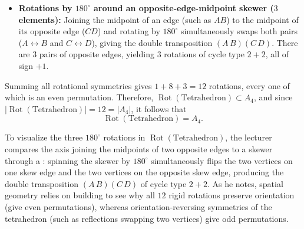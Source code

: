 \begin{proofWrapper}[Proof that \texorpdfstring{$\operatorname{Rot}(\text{Tetrahedron}) = A_4$}{Rot(Tetrahedron) = A\_4}]
\begin{content}
\begin{center}
\end{center}

\begin{itemize}
    \item \textbf{Rotations by $180^\circ$ around an opposite-edge-midpoint skewer ($3$ elements):} Joining the midpoint of an edge (such as $AB$) to the midpoint of its opposite edge ($CD$) and rotating by $180^\circ$ simultaneously swaps both pairs ($A \leftrightarrow B$ and $C \leftrightarrow D$), giving the double transposition $(A\,B)(C\,D)$. There are $3$ pairs of opposite edges, yielding $3$ rotations of cycle type $2+2$, all of sign $+1$.
\end{itemize}

Summing all rotational symmetries gives $1 + 8 + 3 = 12$ rotations, every one of which is an even permutation. Therefore, $\operatorname{Rot}(\text{Tetrahedron}) \subset A_4$, and since $|\operatorname{Rot}(\text{Tetrahedron})| = 12 = |A_4|$, it follows that
\[
\operatorname{Rot}(\text{Tetrahedron}) = A_4.
\]
\end{content}

\end{proofWrapper}

\begin{insight}
To visualize the three $180^\circ$ rotations in $\operatorname{Rot}(\text{Tetrahedron})$, the lecturer compares the axis joining the midpoints of two opposite edges to a skewer through a : spinning the skewer by $180^\circ$ simultaneously flips the two vertices on one skew edge and the two vertices on the opposite skew edge, producing the double transposition $(A\,B)(C\,D)$ of cycle type $2+2$. As he notes, spatial geometry relies on building  to see why all $12$ rigid rotations preserve orientation (give even permutations), whereas orientation-reversing symmetries of the tetrahedron (such as reflections swapping two vertices) give odd permutations.
\end{insight}

